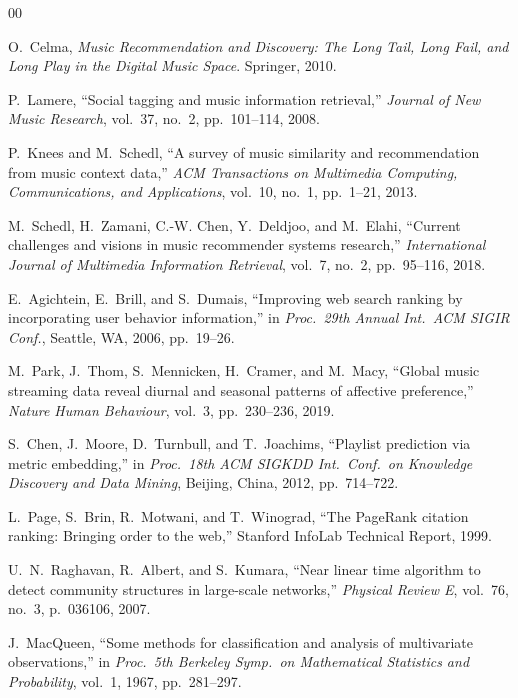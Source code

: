 \documentclass[conference]{IEEEtran}
\begin{document}
\begin{thebibliography}{00}

O.~Celma, \textit{Music Recommendation and Discovery: The Long Tail, Long
Fail, and Long Play in the Digital Music Space}. Springer, 2010.

P.~Lamere, ``Social tagging and music information retrieval,''
\textit{Journal of New Music Research}, vol.~37, no.~2, pp.~101--114, 2008.

P.~Knees and M.~Schedl, ``A survey of music similarity and recommendation
from music context data,'' \textit{ACM Transactions on Multimedia Computing,
Communications, and Applications}, vol.~10, no.~1, pp.~1--21, 2013.

M.~Schedl, H.~Zamani, C.-W. Chen, Y.~Deldjoo, and M.~Elahi, ``Current
challenges and visions in music recommender systems research,''
\textit{International Journal of Multimedia Information Retrieval},
vol.~7, no.~2, pp.~95--116, 2018.

E.~Agichtein, E.~Brill, and S.~Dumais, ``Improving web search ranking by
incorporating user behavior information,'' in \textit{Proc.\ 29th Annual
Int.\ ACM SIGIR Conf.}, Seattle, WA, 2006, pp.~19--26.

M.~Park, J.~Thom, S.~Mennicken, H.~Cramer, and M.~Macy, ``Global music
streaming data reveal diurnal and seasonal patterns of affective preference,''
\textit{Nature Human Behaviour}, vol.~3, pp.~230--236, 2019.

S.~Chen, J.~Moore, D.~Turnbull, and T.~Joachims, ``Playlist prediction via
metric embedding,'' in \textit{Proc.\ 18th ACM SIGKDD Int.\ Conf.\ on
Knowledge Discovery and Data Mining}, Beijing, China, 2012, pp.~714--722.

L.~Page, S.~Brin, R.~Motwani, and T.~Winograd, ``The PageRank citation
ranking: Bringing order to the web,'' Stanford InfoLab Technical Report, 1999.

U.~N.~Raghavan, R.~Albert, and S.~Kumara, ``Near linear time algorithm to
detect community structures in large-scale networks,'' \textit{Physical
Review E}, vol.~76, no.~3, p.~036106, 2007.

J.~MacQueen, ``Some methods for classification and analysis of multivariate
observations,'' in \textit{Proc.\ 5th Berkeley Symp.\ on Mathematical
Statistics and Probability}, vol.~1, 1967, pp.~281--297.


\end{thebibliography}
\end{document}

